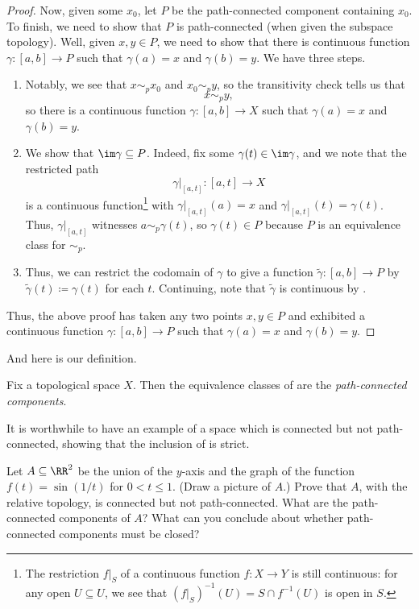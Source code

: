 \documentclass[../notes.tex]{subfiles}
\begin{document}
\begin{proof}
	Now, given some $x_0$, let $P$ be the path-connected component containing $x_0$. To finish, we need to show that $P$ is path-connected (when given the subspace topology). Well, given $x,y\in P$, we need to show that there is continuous function $\gamma\colon[a,b]\to P$ such that $\gamma(a)=x$ and $\gamma(b)=y$. We have three steps.
	\begin{enumerate}
		\item Notably, we see that $x\sim_px_0$ and $x_0\sim_py$, so the transitivity check tells us that
		\[x\sim_py,\]
		so there is a continuous function $\gamma\colon[a,b]\to X$ such that $\gamma(a)=x$ and $\gamma(b)=y$. 
		\item We show that $\im\gamma\subseteq P$. Indeed, fix some $\gamma(t)\in\im\gamma$, and we note that the restricted path
		\[\gamma|_{[a,t]}\colon[a,t]\to X\]
		is a continuous function\footnote{The restriction $f|_S$ of a continuous function $f\colon X\to Y$ is still continuous: for any open $U\subseteq U$, we see that $(f|_S)^{-1}(U)=S\cap f^{-1}(U)$ is open in $S$.} with $\gamma|_{[a,t]}(a)=x$ and $\gamma|_{[a,t]}(t)=\gamma(t)$. Thus, $\gamma|_{[a,t]}$ witnesses $a\sim_p\gamma(t)$, so $\gamma(t)\in P$ because $P$ is an equivalence class for $\sim_p$.
		\item Thus, we can restrict the codomain of $\gamma$ to give a function $\widetilde\gamma\colon[a,b]\to P$ by $\widetilde\gamma(t)\coloneqq\gamma(t)$ for each $t$. Continuing, note that $\widetilde\gamma$ is continuous by .
	\end{enumerate}
	Thus, the above proof has taken any two points $x,y\in P$ and exhibited a continuous function $\gamma\colon[a,b]\to P$ such that $\gamma(a)=x$ and $\gamma(b)=y$.
\end{proof}
And here is our definition.
\begin{definition}
	Fix a topological space $X$. Then the equivalence classes of  are the \textit{path-connected components}.
\end{definition}
It is worthwhile to have an example of a space which is connected but not path-connected, showing that the inclusion of  is strict.
\begin{exe}
	Let $A\subseteq\RR^2$ be the union of the $y$-axis and the graph of the function $f(t)=\sin(1/t)$ for $0<t\le1$. (Draw a picture of $A$.) Prove that $A$, with the relative topology, is connected but not path-connected. What are the path-connected components of $A$? What can you conclude about whether path-connected components must be closed?
\end{exe}
\end{document}
